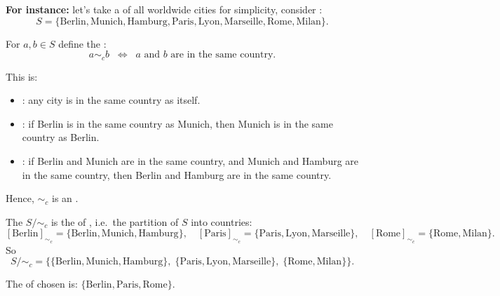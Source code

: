 \textbf{For instance: } let's take a  of all worldwide cities for simplicity, consider :
\[
S = \{\text{Berlin}, \text{Munich}, \text{Hamburg}, \text{Paris}, \text{Lyon}, \text{Marseille}, \text{Rome}, \text{Milan}\}.
\]

For $a,b \in S$ define the :
\[
a \sim_c b \;\;\Longleftrightarrow\;\; a \text{ and } b \text{ are in the same country}.
\]

This  is:
\begin{itemize}
\item {}: any city is in the same country as itself.  
\item {}: if Berlin is in the same country as Munich, then Munich is in the same country as Berlin.  
\item {}: if Berlin and Munich are in the same country, and Munich and Hamburg are in the same country, then Berlin and Hamburg are in the same country.  
\end{itemize}
Hence, $\sim_c$ is an .

The  $S/\sim_c$ is the  of , i.e.\ the partition of $S$ into countries:
\[
[\text{Berlin}]_{\sim_c} = \{\text{Berlin}, \text{Munich}, \text{Hamburg}\}, \quad
[\text{Paris}]_{\sim_c} = \{\text{Paris}, \text{Lyon}, \text{Marseille}\}, \quad
[\text{Rome}]_{\sim_c} = \{\text{Rome}, \text{Milan}\}.
\]
So
\[
S/\sim_c = 
\Big\{
\{\text{Berlin}, \text{Munich}, \text{Hamburg}\},\;
\{\text{Paris}, \text{Lyon}, \text{Marseille}\},\;
\{\text{Rome}, \text{Milan}\}
\Big\}.
\]

The  of chosen  is: $\{\text{Berlin}, \text{Paris}, \text{Rome}\}$.